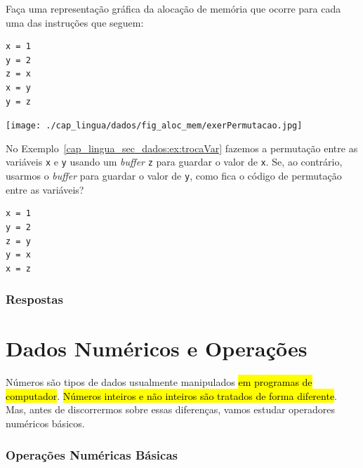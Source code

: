 \begin{exer}
  Faça uma representação gráfica da alocação de memória que ocorre para cada uma das instruções {\python} que seguem:

\begin{lstlisting}
x = 1
y = 2
z = x
x = y
y = z
\end{lstlisting}

\end{exer}
\begin{resp}

  \texttt{[image: ./cap\_lingua/dados/fig\_aloc\_mem/exerPermutacao.jpg]}

\end{resp}

\begin{exer}
  No Exemplo~\ref{cap_lingua_sec_dados:ex:trocaVar} fazemos a permutação entre as variáveis \lstinline+x+ e \lstinline+y+ usando um \textit{buffer} \lstinline+z+ para guardar o valor de \lstinline+x+. Se, ao contrário, usarmos o \textit{buffer} para guardar o valor de \lstinline+y+, como fica o código de permutação entre as variáveis?
\end{exer}
\begin{resp}

\begin{lstlisting}
x = 1
y = 2
z = y
y = x
x = z
\end{lstlisting}

\end{resp}

\ifisbook
\subsubsection{Respostas}
\shipoutAnswer
\fi

\section{Dados Numéricos e Operações}\label{cap_lingua_sec_numop}

Números são tipos de dados usualmente manipulados \hl{em programas de computador}. \hl{Números inteiros e não inteiros são tratados de forma diferente}. Mas, antes de discorrermos sobre essas diferenças, vamos estudar operadores numéricos básicos.

\subsubsection{Operações Numéricas Básicas}

